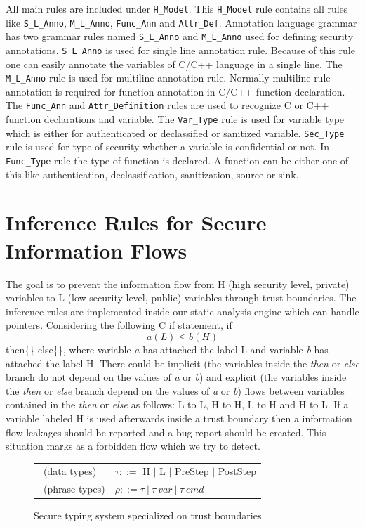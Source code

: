 All main rules are included under \texttt{H\_Model}. This  \texttt{H\_Model} rule contains all rules like \texttt{S\_L\_Anno}, \texttt{M\_L\_Anno}, \texttt{Func\_Ann} and \texttt{Attr\_Def}. Annotation language grammar has two grammar rules named \texttt{S\_L\_Anno} and \texttt{M\_L\_Anno} used for defining security annotations. \texttt{S\_L\_Anno} is used for single line annotation rule. Because of this rule one can easily annotate the variables of C/C++ language in a single line. The \texttt{M\_L\_Anno} rule is used for multiline annotation rule. Normally multiline rule annotation is required for function annotation in C/C++ function declaration. The \texttt{Func\_Ann} and \texttt{Attr\_Definition} rules are used to recognize C or C++ function declarations and variable. The \texttt{Var\_Type} rule is used for variable type which is either for authenticated or declassified or sanitized variable. \texttt{Sec\_Type} rule is used for type of security whether a variable is confidential or not. In \texttt{Func\_Type} rule the type of function is declared. A function can be either one of this like authentication, declassification, sanitization, source or sink.

\section{Inference Rules for Secure Information Flows}

The goal is to prevent the information flow from H (high security level, private) variables to 
L (low security level, public) variables through trust boundaries. The inference rules are implemented
inside our static analysis engine which can handle pointers. Considering the following C if statement, if  \[ a(L) \leq b(H)\] then\{\} else\{\}, where variable \emph{a} has attached the label L and variable \emph{b} has attached the label H.
There could be implicit (the variables inside the \emph{then} or \emph{else} branch do not depend on the values of \emph{a}  or \emph{b}) 
and explicit (the variables inside the \emph{then} or \emph{else} branch depend on the values of \emph{a} or \emph{b}) flows between variables
contained in the \emph{then} or \emph{else} as follows: L to L, H to H, L to H and H to L. If a variable labeled H is used afterwards inside
a trust boundary then a information flow leakages should be reported and a bug report should be created. This situation marks as a forbidden flow which we try to detect.

\begin{figure}[ht!]
	\centering
	\begin{tabular}{ll}    
		\circled{A}\ (data types)   &$\tau ::= $ H    $|$  L  $|$ PreStep $|$ PostStep   \\ 
		\circled{B}\ (phrase types) &$\rho ::=  \tau \ | \ \tau \ var \ | \ \tau \ cmd $ \\
	\end{tabular}
	\vspace{1em}
	\caption{Secure typing system specialized on trust boundaries}
	\label{typing:system1}
\end{figure}

